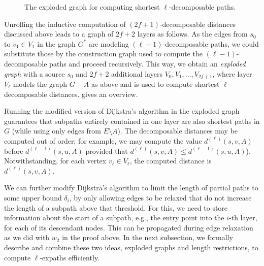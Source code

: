 \documentclass{theoretics}
\renewcommand{\le}{\leqslant}
\begin{document}
\begin{figure}[t]
  \caption{The exploded graph for computing shortest $\ell$-decomposable paths.}
  \label{fig:exploded graph}
\end{figure}

Unrolling the inductive computation of $(2f{+}1)$-decomposable distances
discussed above leads to a graph of $2f+2$ layers as follows.
As the edges from $s_0$ to $v_1 \in V_1$ in the graph $G^*$ are modeling $(\ell{-}1)$-decomposable paths,
we could substitute those by the construction graph used to compute the $(\ell{-}1)$-decomposable paths and proceed recursively.
This way, we obtain an \emph{exploded graph} with a source $s_0$ and $2f+2$ additional layers $V_0,V_1,\ldots,V_{2f+1}$, where layer $V_\ell$ models the graph $G-A$ as above 
and is used to compute shortest $\ell$-decomposable distances.
 gives an overview.

Running the modified version of Dijkstra's algorithm in the exploded graph guarantees that subpaths entirely contained in one layer are also shortest paths in $G$ (while using only edges from $E{\setminus}A$).
The decomposable distances may be computed out of order;
for example, we may compute the value $d^{(\ell)}(s,v,A)$ before $d^{(\ell-1)}(s,u,A)$ 
provided that $d^{(\ell)}(s,v,A) \le d^{(\ell-1)}(s,u,A)$).
Notwithstanding, for each vertex $v_\ell \in V_\ell$, the computed distance is $d^{(\ell)}(s,v,A)$.

We can further modify Dijkstra's algorithm to limit the length of partial paths to some upper bound $\delta_{i}$, by only allowing edges to be relaxed that do not increase the length of a subpath above that threshold.
For this, we need to store information about the start of a subpath,
e.g., the entry point into the $i$-th layer, for each of its descendant nodes.
This can be propagated during edge relaxation as we did with $w_2$ in the proof above.
In the next subsection, we formally describe and combine these two ideas,
exploded graphs and length restrictions, to compute $\ell$-expaths efficiently.
\end{document}

